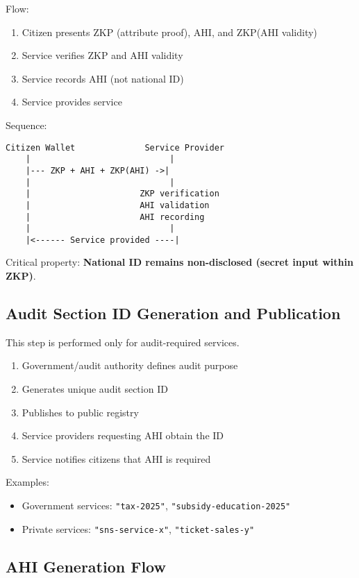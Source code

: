 Flow:
\begin{enumerate}
  \item Citizen presents ZKP (attribute proof), AHI, and ZKP(AHI validity)
  \item Service verifies ZKP and AHI validity
  \item Service records AHI (not national ID)
  \item Service provides service
\end{enumerate}

Sequence:
\begin{verbatim}
Citizen Wallet              Service Provider
    |                            |
    |--- ZKP + AHI + ZKP(AHI) ->|
    |                            |
    |                      ZKP verification
    |                      AHI validation
    |                      AHI recording
    |                            |
    |<------ Service provided ----|
\end{verbatim}

Critical property: \textbf{National ID remains non-disclosed (secret input within ZKP)}.

\subsection{Audit Section ID Generation and Publication}

This step is performed only for audit-required services.

\begin{enumerate}
  \item Government/audit authority defines audit purpose
  \item Generates unique audit section ID
  \item Publishes to public registry
  \item Service providers requesting AHI obtain the ID
  \item Service notifies citizens that AHI is required
\end{enumerate}

Examples:
\begin{itemize}
  \item Government services: \texttt{"tax-2025"}, \texttt{"subsidy-education-2025"}
  \item Private services: \texttt{"sns-service-x"}, \texttt{"ticket-sales-y"}
\end{itemize}

\subsection{AHI Generation Flow}

